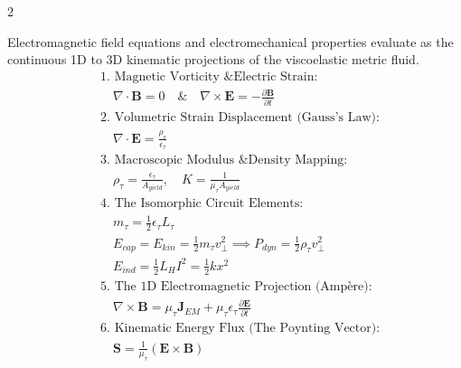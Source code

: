 \documentclass[11pt, a4paper]{article}
\newcounter{cheatnum}
\begin{document}
\begin{multicols}{2}
\begin{tcolorbox}[cheatbox, title={\refstepcounter{cheatnum}\label{box:em_lc_isomorphism}\thecheatnum. EM Kinematics \& The LC-Acoustic Isomorphism \scriptsize\hfill\hyperref[sec:deriv_em_lc_isomorphism]{[Proof $\downarrow$]}}]
Electromagnetic field equations and electromechanical properties evaluate as the continuous 1D to 3D kinematic projections of the viscoelastic metric fluid.
\begin{align}
    &\text{1. Magnetic Vorticity \& Electric Strain:} \nonumber \\
    &\quad \nabla \cdot \mathbf{B} = 0 \quad \text{\&} \quad \nabla \times \mathbf{E} = -\frac{\partial \mathbf{B}}{\partial t} \label{eq:maxwell_gauss_faraday} \\
    &\text{2. Volumetric Strain Displacement (Gauss's Law):} \nonumber \\
    &\quad \nabla \cdot \mathbf{E} = \frac{\rho_e}{\epsilon_{\tau}} \label{eq:maxwell_gaussE} \\
    &\text{3. Macroscopic Modulus \& Density Mapping:} \nonumber \\
    &\quad \rho_{\tau} = \frac{\epsilon_{\tau}}{A_{yield}}, \quad K = \frac{1}{\mu_{\tau} A_{yield}} \label{eq:lc_constants} \\
    &\text{4. The Isomorphic Circuit Elements:} \nonumber \\
    &\quad m_\tau = \frac{1}{2} \epsilon_{\tau} L_\tau \label{eq:lc_mass} \\
    &\quad E_{cap} = E_{kin} = \frac{1}{2} m_{\tau} v_{\perp}^2 \implies P_{dyn} = \frac{1}{2}\rho_{\tau} v_{\perp}^2 \label{eq:velocity_pressure} \\
    &\quad E_{ind} = \frac{1}{2} L_H I^2 = \frac{1}{2} k x^2 \label{eq:lc_inductance} \\
    &\text{5. The 1D Electromagnetic Projection (Ampère):} \nonumber \\
    &\quad \nabla \times \mathbf{B} = \mu_{\tau} \mathbf{J}_{EM} + \mu_{\tau} \epsilon_{\tau} \frac{\partial \mathbf{E}}{\partial t} \label{eq:maxwell_curlB} \\
    &\text{6. Kinematic Energy Flux (The Poynting Vector):} \nonumber \\
    &\quad \mathbf{S} = \frac{1}{\mu_{\tau}} (\mathbf{E} \times \mathbf{B}) \label{eq:poynting_flux}
\end{align}
\end{tcolorbox}


\end{multicols}
\end{document}
